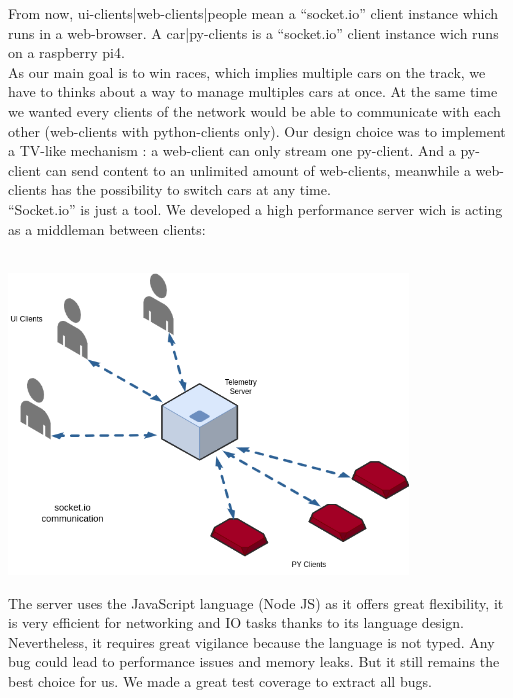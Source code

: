 \documentclass[12pt]{article}
\begin{document}
From now, ui-clients|web-clients|people mean a “socket.io” client instance which runs in a web-browser. A car|py-clients is a “socket.io” client instance wich runs on a raspberry pi4. \\

As our main goal is to win races, which implies multiple cars on the track, we have to thinks about a way to manage multiples cars at once. At the same time we wanted every clients of the network would be able to communicate with each other (web-clients with python-clients only). Our design choice was to implement a TV-like mechanism : a web-client can only stream one py-client. And a py-client can send content to an unlimited amount of web-clients, meanwhile a web-clients has the possibility to switch cars at any time. \\

“Socket.io” is just a tool. We developed a high performance server wich is acting as a middleman between clients: \\ \\
\centerline{\includegraphics[height=8cm]{../../docs/diagram.png}}

The server uses the JavaScript language (Node JS) as it offers great flexibility, it is very efficient for networking and IO tasks thanks to its language design. Nevertheless, it requires great vigilance because the language is not typed. Any bug could lead to performance issues and memory leaks. But it still remains the best choice for us. We made a great test coverage to extract all bugs. \\
\end{document}

